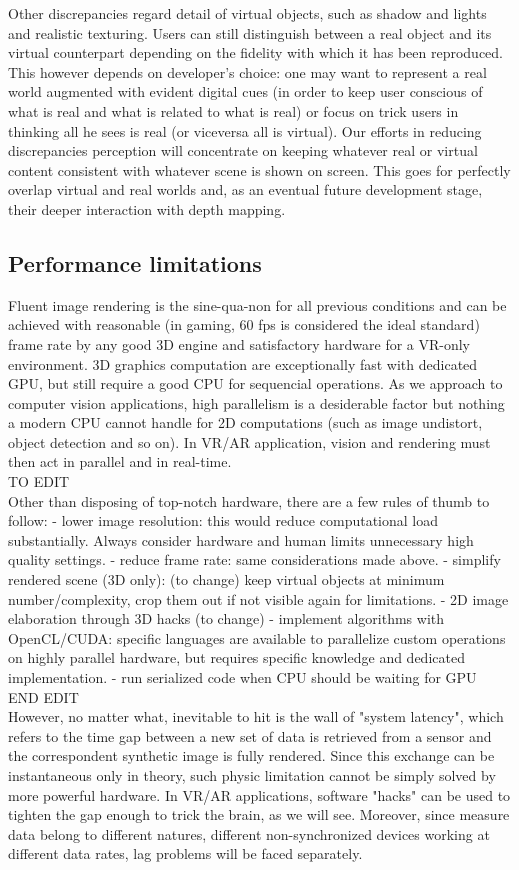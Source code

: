 Other discrepancies regard detail of virtual objects, such as shadow and lights and realistic texturing. Users can still distinguish between a real object and its virtual counterpart depending on the fidelity with which it has been reproduced. This however depends on developer's choice: one may want to represent a real world augmented with evident digital cues (in order to keep user conscious of what is real and what is related to what is real) or focus on trick users in thinking all he sees is real (or viceversa all is virtual). Our efforts in reducing discrepancies perception will concentrate on keeping whatever real or virtual content consistent with whatever scene is shown on screen. This goes for perfectly overlap virtual and real worlds and, as an eventual future development stage, their deeper interaction with depth mapping.

\subsection{Performance limitations}
Fluent image rendering is the sine-qua-non for all previous conditions and can be achieved with reasonable (in gaming, 60 fps is considered the ideal standard) frame rate by any good 3D engine and satisfactory hardware for a VR-only environment. 3D graphics computation are exceptionally fast with dedicated GPU, but still require a good CPU for sequencial operations. As we approach to computer vision applications, high parallelism is a desiderable factor but nothing a modern CPU cannot handle for 2D computations (such as image undistort, object detection and so on). In VR/AR application, vision and rendering must then act in parallel and in real-time.\\
TO EDIT\\
Other than disposing of top-notch hardware, there are a few rules of thumb to follow:
- lower image resolution: this would reduce computational load substantially. Always consider hardware and human limits unnecessary high quality settings.
- reduce frame rate: same considerations made above.
- simplify rendered scene (3D only): (to change) keep virtual objects at minimum number/complexity, crop them out if not visible again for limitations.
- 2D image elaboration through 3D hacks (to change)
- implement algorithms with OpenCL/CUDA: specific languages are available to parallelize custom operations on highly parallel hardware, but requires specific knowledge and dedicated implementation.
- run serialized code when CPU should be waiting for GPU\\
END EDIT\\
However, no matter what, inevitable to hit is the wall of "system latency", which refers to the time gap between a new set of data is retrieved from a sensor and the correspondent synthetic image is fully rendered. Since this exchange can be instantaneous only in theory, such physic limitation cannot be simply solved by more powerful hardware. In VR/AR applications, software "hacks" can be used to tighten the gap enough to trick the brain, as we will see. Moreover, since measure data belong to different natures, different non-synchronized devices working at different data rates, lag problems will be faced separately. 

